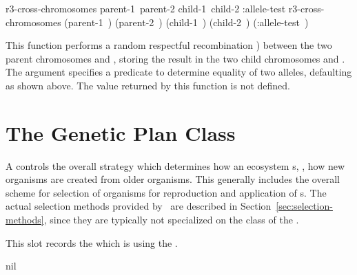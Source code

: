 {\filbreak
{\samepage
\Defgeneric r3-cross-chromosomes {\hbox{parent-1 parent-2} \hbox{child-1 child-2}
                                  \key :allele-test}
 r3-cross-chromosomes {\hbox{(parent-1 )}
                                 \hbox{(parent-2 )}
                                 \hbox{(child-1 )}
                                 \hbox{(child-2 )}
                                 \key \hbox{(:allele-test )}}

This function performs a random respectful recombination 
\cite{ga:radcliffe92-11,ga:radcliffe92-04}) between the two parent chromosomes
 and , storing the result in the two child chromosomes
 and . The  argument specifies a
predicate to determine equality of two alleles, defaulting as shown above.
The value returned by this function is not defined.
\par}%
\filbreak


\section{The Genetic Plan Class} \label{sec:genetic-plan}

A  controls the overall strategy which
determines how an ecosystem s, \ie, how new
organisms are created from older organisms. This generally includes the overall
scheme for selection of organisms for reproduction and application
of s. The actual selection methods provided by
\geco\ are described in Section~\ref{sec:selection-methods}, since they are
typically not specialized on the class of the .

\gap

\filbreak
{\samepage
	
	\gap
	
	
	
	This slot records the  which is using the .
	\par}%

\filbreak
{\samepage
	 {nil}
	
}}
